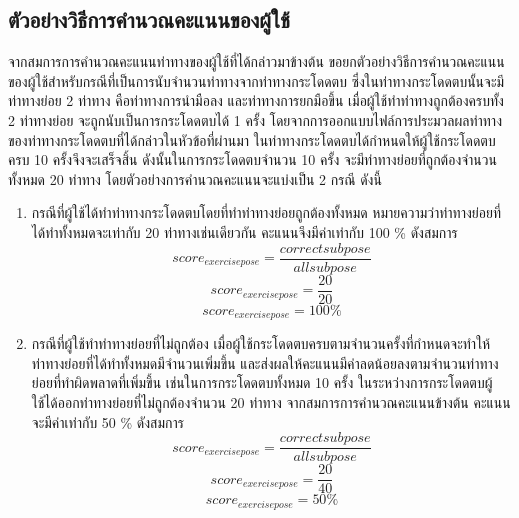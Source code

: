 \subsection{ตัวอย่างวิธีการคำนวณคะแนนของผู้ใช้}
จากสมการการคำนวณคะแนนท่าทางของผู้ใช้ที่ได้กล่าวมาข้างต้น ขอยกตัวอย่างวิธีการคำนวณคะแนนของผู้ใช้สำหรับกรณีที่เป็นการนับจำนวนท่าทางจากท่าทางกระโดดตบ ซึ่งในท่าทางกระโดดตบนั้นจะมีท่าทางย่อย 2 ท่าทาง คือท่าทางการนำมือลง และท่าทางการยกมือขึ้น เมื่อผู้ใช้ทำท่าทางถูกต้องครบทั้ง 2 ท่าทางย่อย จะถูกนับเป็นการกระโดดตบได้ 1 ครั้ง โดยจากการออกแบบไฟล์การประมวลผลท่าทางของท่าทางกระโดดตบที่ได้กล่าวในหัวข้อที่ผ่านมา ในท่าทางกระโดดตบได้กำหนดให้ผู้ใช้กระโดดตบครบ 10 ครั้งจึงจะเสร็จสิ้น ดังนั้นในการกระโดดตบจำนวน 10 ครั้ง จะมีท่าทางย่อยที่ถูกต้องจำนวนทั้งหมด 20 ท่าทาง โดยตัวอย่างการคำนวณคะแนนจะแบ่งเป็น 2 กรณี ดังนี้ 
\begin{enumerate}
    \item กรณีที่ผู้ใช้ได้ทำท่าทางกระโดดตบโดยที่ทำท่าทางย่อยถูกต้องทั้งหมด หมายความว่าท่าทางย่อยที่ได้ทำทั้งหมดจะเท่ากับ 20 ท่าทางเช่นเดียวกัน คะแนนจึงมีค่าเท่ากับ 100 \% ดังสมการ
    \begin{equation}
        score_{exercise pose} = \frac{correct subpose}{all subpose}
    \end{equation}
    \begin{equation}
        score_{exercise pose} = \frac{20}{20}
    \end{equation}
    \begin{equation}
        score_{exercise pose} = 100 \%
    \end{equation}
    \item กรณีที่ผู้ใช้ทำท่าทางย่อยที่ไม่ถูกต้อง เมื่อผู้ใช้กระโดดตบครบตามจำนวนครั้งที่กำหนดจะทำให้ท่าทางย่อยที่ได้ทำทั้งหมดมีจำนวนเพิ่มขึ้น และส่งผลให้คะแนนมีค่าลดน้อยลงตามจำนวนท่าทางย่อยที่ทำผิดพลาดที่เพิ่มขึ้น เช่นในการกระโดดตบทั้งหมด 10 ครั้ง ในระหว่างการกระโดดตบผู้ใช้ได้ออกท่าทางย่อยที่ไม่ถูกต้องจำนวน 20 ท่าทาง จากสมการการคำนวณคะแนนข้างต้น คะแนนจะมีค่าเท่ากับ 50 \% ดังสมการ
    \begin{equation}
        score_{exercise pose} = \frac{correct subpose}{all subpose}
    \end{equation}
    \begin{equation}
        score_{exercise pose} = \frac{20}{40}
    \end{equation}        
    \begin{equation}
        score_{exercise pose} = 50 \%
    \end{equation}
\end{enumerate}